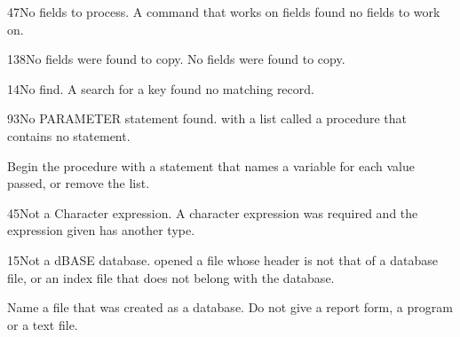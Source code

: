 \begin{XbaseMessageEntry}{47}{No fields to process.}
A command that works on fields found no fields to work on.
\end{XbaseMessageEntry}

\begin{XbaseMessageEntry}{138}{No fields were found to copy.}
No fields were found to copy.
\end{XbaseMessageEntry}

\begin{XbaseMessageEntry}{14}{No find.}
A search for a key found no matching record.
\end{XbaseMessageEntry}

\begin{XbaseMessageEntry}{93}{No PARAMETER statement found.}
 with a  list called a procedure that contains no  statement.

Begin the procedure with a  statement that names a variable for each value passed, or remove the  list.
\end{XbaseMessageEntry}

\begin{XbaseMessageEntry}{45}{Not a Character expression.}
A character expression was required and the expression given has another type.
\end{XbaseMessageEntry}

\begin{XbaseMessageEntry}{15}{Not a dBASE database.}
 opened a file whose header is not that of a database file, or an index file that does not belong with the database.

Name a file that was created as a database. Do not give  a report form, a program or a text file.
\end{XbaseMessageEntry}

